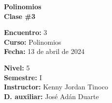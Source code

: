 \begin{center} \textbf
{
    \Large Polinomios \\ \vspace{2mm}Clase \#3
}
\end{center}

\begin{multicols}{2}
{
    \textbf{Encuentro:} 3\\
    \textbf{Curso:} Polinomios\\
    \textbf{Fecha:} 13 de abril de 2024\\
    \begin{flushright}
        \textbf{Nivel:} 5\\
        \textbf{Semestre:} I\\
        \textbf{Instructor:} Kenny Jordan Tinoco\\
        \textbf{D. auxiliar: }José Adán Duarte
    \end{flushright}
}
\end{multicols}

\thispagestyle{first-page-style}